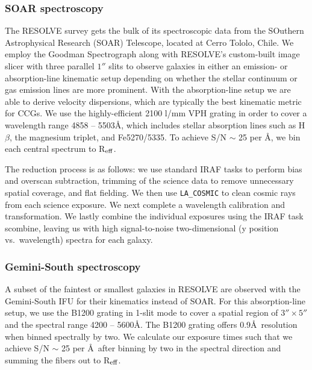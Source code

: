\documentclass[iop,apj]{emulateapj}
\newcommand{\Reff}{R$_{\rm eff}$}
\begin{document}
\subsubsection{SOAR spectroscopy}
  The RESOLVE survey gets the bulk of its spectroscopic data from the SOuthern Astrophysical Research (SOAR) Telescope, located at Cerro Tololo, Chile. We employ the Goodman Spectrograph \citep{Clemens2004} along with RESOLVE's custom-built image slicer with three parallel $1''$ slits to observe galaxies in either an emission- or absorption-line kinematic setup depending on whether the stellar continuum or gas emission lines are more prominent. With the absorption-line setup we are able to derive velocity dispersions, which are typically the best kinematic metric for CCGs. We use the highly-efficient 2100 l/mm VPH grating in order to cover a wavelength range 4858 -- 5503\AA, which includes stellar absorption lines such as H$\beta$, the magnesium triplet, and Fe5270/5335. To achieve S/N $\sim$ 25 per \AA, we bin each central spectrum to \Reff.

The reduction process is as follows: we use standard IRAF tasks to perform bias and overscan subtraction, trimming of the science data to remove unnecessary spatial coverage, and flat fielding. We then use \texttt{LA\_COSMIC} \citep{vanDokkum2001} to clean cosmic rays from each science exposure. We next complete a wavelength calibration and transformation. We lastly combine the individual exposures using the IRAF task scombine, leaving us with high signal-to-noise two-dimensional (y position vs.~wavelength) spectra for each galaxy.

\subsubsection{Gemini-South spectroscopy}

  A subset of the faintest or smallest galaxies in RESOLVE are observed with the Gemini-South IFU for their kinematics instead of SOAR. For this absorption-line setup, we use the B1200 grating in 1-slit mode to cover a spatial region of $3''\times5''$ and the spectral range 4200 -- 5600\AA. The B1200 grating offers 0.9\AA\ resolution when binned spectrally by two. We calculate our exposure times such that we achieve S/N $\sim$ 25 per \AA\, after binning by two in the spectral direction and summing the fibers out to \Reff.
\end{document}
